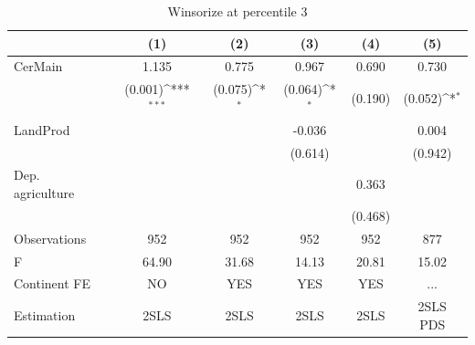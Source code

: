 \documentclass[12pt,a4paper]{article}
\begin{document}
\begin{table}[htbp]\centering
\def\sym#1{\ifmmode^{#1}\else\(^{#1}\)\fi}
\caption{Winsorize at percentile 3}
\begin{tabular}{l*{5}{c}}
\hline\hline
                &\multicolumn{1}{c}{(1)}         &\multicolumn{1}{c}{(2)}         &\multicolumn{1}{c}{(3)}         &\multicolumn{1}{c}{(4)}         &\multicolumn{1}{c}{(5)}         \\
\hline
CerMain         &    1.135         &    0.775         &    0.967         &    0.690         &    0.730         \\
                &  (0.001)\sym{***}&  (0.075)\sym{*}  &  (0.064)\sym{*}  &  (0.190)         &  (0.052)\sym{*}  \\
LandProd        &                  &                  &   -0.036         &                  &    0.004         \\
                &                  &                  &  (0.614)         &                  &  (0.942)         \\
Dep. agriculture&                  &                  &                  &    0.363         &                  \\
                &                  &                  &                  &  (0.468)         &                  \\
\hline
Observations    &      952         &      952         &      952         &      952         &      877         \\
F               &    64.90         &    31.68         &    14.13         &    20.81         &    15.02         \\
Continent FE    &       NO         &      YES         &      YES         &      YES         &      ...         \\
Estimation      &     2SLS         &     2SLS         &     2SLS         &     2SLS         & 2SLS PDS         \\
\hline\hline
\end{tabular}
\end{table}
\end{document}
